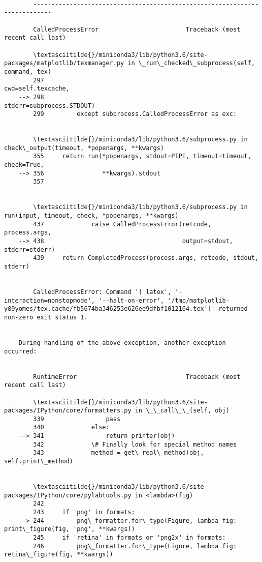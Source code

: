 \documentclass[11pt]{article}
\begin{document}
    \begin{Verbatim}[commandchars=\\\{\}]

        ---------------------------------------------------------------------------

        CalledProcessError                        Traceback (most recent call last)

        \textasciitilde{}/miniconda3/lib/python3.6/site-packages/matplotlib/texmanager.py in \_run\_checked\_subprocess(self, command, tex)
        297                                              cwd=self.texcache,
    --> 298                                              stderr=subprocess.STDOUT)
        299         except subprocess.CalledProcessError as exc:


        \textasciitilde{}/miniconda3/lib/python3.6/subprocess.py in check\_output(timeout, *popenargs, **kwargs)
        355     return run(*popenargs, stdout=PIPE, timeout=timeout, check=True,
    --> 356                **kwargs).stdout
        357 


        \textasciitilde{}/miniconda3/lib/python3.6/subprocess.py in run(input, timeout, check, *popenargs, **kwargs)
        437             raise CalledProcessError(retcode, process.args,
    --> 438                                      output=stdout, stderr=stderr)
        439     return CompletedProcess(process.args, retcode, stdout, stderr)


        CalledProcessError: Command '['latex', '-interaction=nonstopmode', '--halt-on-error', '/tmp/matplotlib-y89yomes/tex.cache/fb5674ba346253e626ee9dfbf1012164.tex']' returned non-zero exit status 1.

        
    During handling of the above exception, another exception occurred:


        RuntimeError                              Traceback (most recent call last)

        \textasciitilde{}/miniconda3/lib/python3.6/site-packages/IPython/core/formatters.py in \_\_call\_\_(self, obj)
        339                 pass
        340             else:
    --> 341                 return printer(obj)
        342             \# Finally look for special method names
        343             method = get\_real\_method(obj, self.print\_method)


        \textasciitilde{}/miniconda3/lib/python3.6/site-packages/IPython/core/pylabtools.py in <lambda>(fig)
        242 
        243     if 'png' in formats:
    --> 244         png\_formatter.for\_type(Figure, lambda fig: print\_figure(fig, 'png', **kwargs))
        245     if 'retina' in formats or 'png2x' in formats:
        246         png\_formatter.for\_type(Figure, lambda fig: retina\_figure(fig, **kwargs))



\end{Verbatim}
\end{document}
